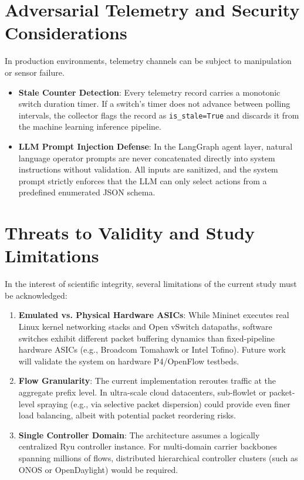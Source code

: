 \section{Adversarial Telemetry and Security Considerations}
In production environments, telemetry channels can be subject to manipulation or sensor failure.
\begin{itemize}
  \item \textbf{Stale Counter Detection}: Every telemetry record carries a monotonic switch duration timer. If a switch's timer does not advance between polling intervals, the collector flags the record as \texttt{is\_stale=True} and discards it from the machine learning inference pipeline.
  \item \textbf{LLM Prompt Injection Defense}: In the LangGraph agent layer, natural language operator prompts are never concatenated directly into system instructions without validation. All inputs are sanitized, and the system prompt strictly enforces that the LLM can only select actions from a predefined enumerated JSON schema.
\end{itemize}

\section{Threats to Validity and Study Limitations}
In the interest of scientific integrity, several limitations of the current study must be acknowledged:
\begin{enumerate}
  \item \textbf{Emulated vs. Physical Hardware ASICs}: While Mininet executes real Linux kernel networking stacks and Open vSwitch datapaths, software switches exhibit different packet buffering dynamics than fixed-pipeline hardware ASICs (e.g., Broadcom Tomahawk or Intel Tofino). Future work will validate the system on hardware P4/OpenFlow testbeds.
  \item \textbf{Flow Granularity}: The current implementation reroutes traffic at the aggregate prefix level. In ultra-scale cloud datacenters, sub-flowlet or packet-level spraying (e.g., via selective packet dispersion) could provide even finer load balancing, albeit with potential packet reordering risks.
  \item \textbf{Single Controller Domain}: The architecture assumes a logically centralized Ryu controller instance. For multi-domain carrier backbones spanning millions of flows, distributed hierarchical controller clusters (such as ONOS or OpenDaylight) would be required.
\end{enumerate}
